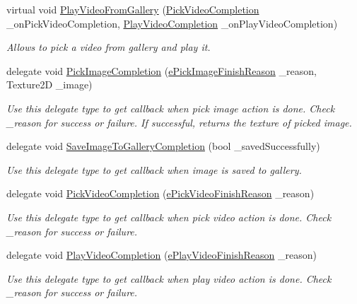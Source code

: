 \begin{DoxyCompactItemize}
virtual void \hyperlink{class_voxel_busters_1_1_native_plugins_1_1_media_library_aa2544dbf89d6b643672a8439e0b21566}{Play\+Video\+From\+Gallery} (\hyperlink{class_voxel_busters_1_1_native_plugins_1_1_media_library_a693a7a3dd11e94e64de370bc78e23b45}{Pick\+Video\+Completion} \+\_\+on\+Pick\+Video\+Completion, \hyperlink{class_voxel_busters_1_1_native_plugins_1_1_media_library_abdb2811c23515fd8ac3335152b5a8951}{Play\+Video\+Completion} \+\_\+on\+Play\+Video\+Completion)
\begin{DoxyCompactList}\small\item\em Allows to pick a video from gallery and play it. \end{DoxyCompactList}\item 
delegate void \hyperlink{class_voxel_busters_1_1_native_plugins_1_1_media_library_a95dd54d80020c5ba3c14361984b098c7}{Pick\+Image\+Completion} (\hyperlink{namespace_voxel_busters_1_1_native_plugins_a827272a4a290f79aec1c1634fcb15ab0}{e\+Pick\+Image\+Finish\+Reason} \+\_\+reason, Texture2\+D \+\_\+image)
\begin{DoxyCompactList}\small\item\em Use this delegate type to get callback when pick image action is done. Check \+\_\+reason for success or failure. If successful, returns the texture of picked image. \end{DoxyCompactList}\item 
delegate void \hyperlink{class_voxel_busters_1_1_native_plugins_1_1_media_library_a2dc4a641f32b69e42c223332fa7dfebd}{Save\+Image\+To\+Gallery\+Completion} (bool \+\_\+saved\+Successfully)
\begin{DoxyCompactList}\small\item\em Use this delegate type to get callback when image is saved to gallery. \end{DoxyCompactList}\item 
delegate void \hyperlink{class_voxel_busters_1_1_native_plugins_1_1_media_library_a693a7a3dd11e94e64de370bc78e23b45}{Pick\+Video\+Completion} (\hyperlink{namespace_voxel_busters_1_1_native_plugins_a461fe22d94c9553cd71a869b628c698d}{e\+Pick\+Video\+Finish\+Reason} \+\_\+reason)
\begin{DoxyCompactList}\small\item\em Use this delegate type to get callback when pick video action is done. Check \+\_\+reason for success or failure. \end{DoxyCompactList}\item 
delegate void \hyperlink{class_voxel_busters_1_1_native_plugins_1_1_media_library_abdb2811c23515fd8ac3335152b5a8951}{Play\+Video\+Completion} (\hyperlink{namespace_voxel_busters_1_1_native_plugins_a1573f15aadb41505f5f0c0ae33abe7e1}{e\+Play\+Video\+Finish\+Reason} \+\_\+reason)
\begin{DoxyCompactList}\small\item\em Use this delegate type to get callback when play video action is done. Check \+\_\+reason for success or failure. \end{DoxyCompactList}\end{DoxyCompactItemize}


